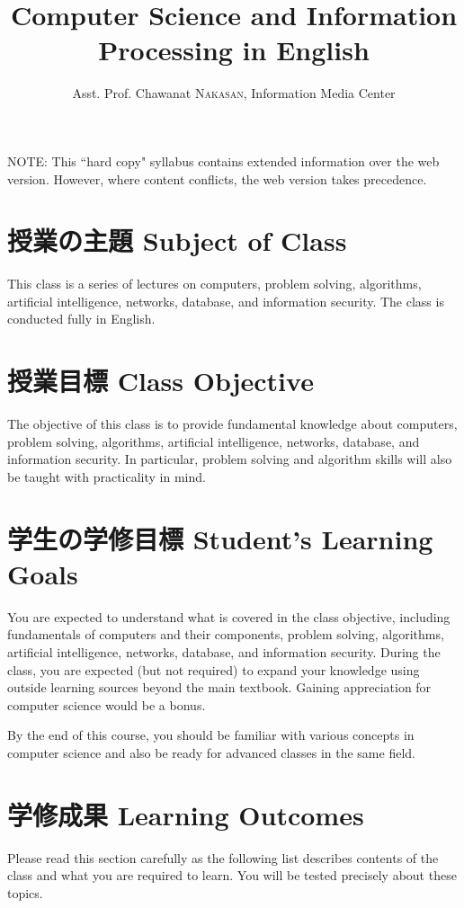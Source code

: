 \documentclass{article}
\title{Computer Science and Information Processing \newline
[情報の科学] in English}
\author{Asst. Prof. Chawanat \textsc{Nakasan}, Information Media Center}
\date{}
\begin{document}
\maketitle

\noindent
NOTE: This ``hard copy" syllabus contains extended information over the web version. However, where content conflicts, the web version takes precedence.

\section{授業の主題 Subject of Class}
This class is a series of lectures on computers, problem solving, algorithms, artificial intelligence, networks, database, and information security.
The class is conducted fully in English.

\section{授業目標 Class Objective}
The objective of this class is to provide fundamental knowledge about computers, problem solving, algorithms, artificial intelligence, networks, database, and information security.
In particular, problem solving and algorithm skills will also be taught with practicality in mind.

\section{学生の学修目標 Student's Learning Goals}
You are expected to understand what is covered in the class objective, including fundamentals of computers and their components, problem solving, algorithms, artificial intelligence, networks, database, and information security. During the class, you are expected (but not required) to expand your knowledge using outside learning sources beyond the main textbook. Gaining appreciation for computer science would be a bonus.

By the end of this course, you should be familiar with various concepts in computer science and also be ready for advanced classes in the same field.

\section{学修成果 Learning Outcomes}
\label{goals}
Please read this section carefully as the following list describes contents of the class and what you are required to learn. You will be tested precisely about these topics.
\end{document}
